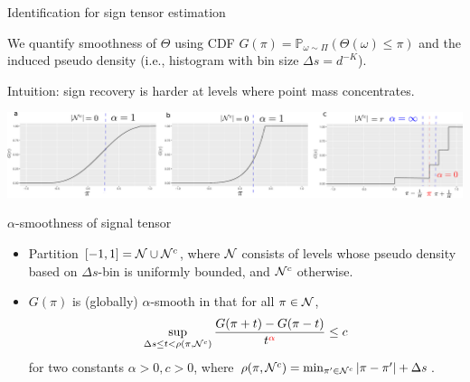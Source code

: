 \documentclass[10pt, mathserif]{beamer} %
\theoremstyle{definition}
\theoremstyle{plain}
\begin{document}
\begin{frame}{Identification for sign tensor estimation}


We quantify smoothness of $\Theta$ using CDF $G(\pi)=\mathbb{P}_{\omega\sim\Pi}(\Theta(\omega)\leq \pi)$ and the induced pseudo density (i.e., histogram with bin size $\Delta s=d^{-K}$).
 \pause
 
Intuition: {\color{red}sign recovery} is harder at {\color{red}levels where point mass concentrates}. 
 \begin{center}
 \includegraphics[width = \textwidth]{Figures/cdf_new.pdf}
 \end{center}
 
  \vspace{-.2cm} 
 \begin{block}{$\alpha$-smoothness of signal tensor}
\begin{itemize}
\item Partition $[-1,1]=\mathcal{N} \cup \mathcal{N}^c$, where $\mathcal{N}$ consists of levels whose pseudo density based on $\Delta s$-bin is uniformly bounded, and $\mathcal{N}^c$ otherwise. 
\item $G(\pi)$ is (globally) {\color{red}$\alpha$-smooth} in that for {\color{red}all $\pi\in \mathcal{N}$},
\vspace{-.2cm}
\begin{equation}\label{eq:smooth}
\sup_{\Delta s \leq t<\rho(\pi, \tN^c)}{G(\pi+{t})-G(\pi-{t})\over t^{\color{red}\alpha}} \leq c
\vspace{-.2cm}
\end{equation}
for two constants $\alpha>0,c >0$, where $\rho(\pi,\mathcal{N}^c) = \min_{\pi'\in\mathcal{N}^c}|\pi-\pi'|+\Delta s$. 
\end{itemize}
\end{block}


\end{frame}
\end{document}

